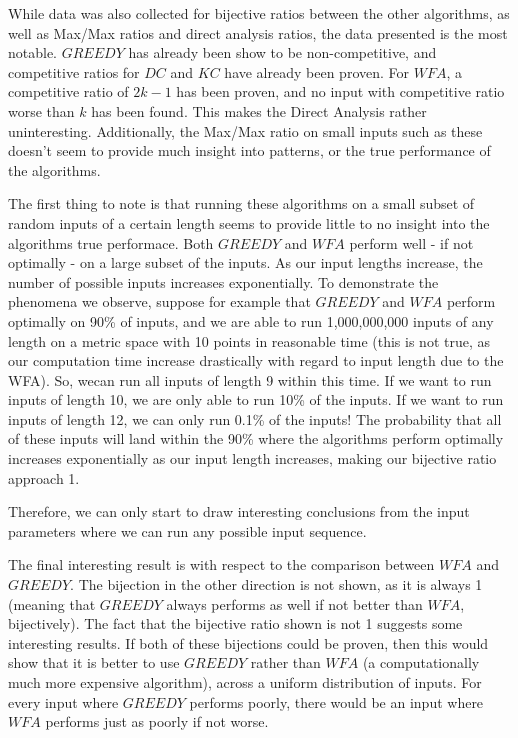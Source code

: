 While data was also collected for bijective ratios between the other algorithms, as well as Max/Max ratios and direct analysis ratios, the data presented is the most notable. $GREEDY$ has already been show to be non-competitive, and competitive ratios for $DC$ and $KC$ have already been proven. For $WFA$, a competitive ratio of $2k-1$ has been proven, and no input with competitive ratio worse than $k$ has been found. This makes the Direct Analysis rather uninteresting. Additionally, the Max/Max ratio on small inputs such as these doesn't seem to provide much insight into patterns, or the true performance of the algorithms.

The first thing to note is that running these algorithms on a small subset of random inputs of a certain length seems to provide little to no insight into the algorithms true performace. Both $GREEDY$ and $WFA$ perform well - if not optimally - on a large subset of the inputs. As our input lengths increase, the number of possible inputs increases exponentially. To demonstrate the phenomena we observe, suppose for example that $GREEDY$ and $WFA$ perform optimally on 90\% of inputs, and we are able to run 1,000,000,000 inputs of any length on a metric space with 10 points in reasonable time (this is not true, as our computation time increase drastically with regard to input length due to the WFA). So, wecan run all inputs of length 9 within this time. If we want to run inputs of length 10, we are only able to run 10\% of the inputs. If we want to run inputs of length 12, we can only run 0.1\% of the inputs! The probability that all of these inputs will land within the 90\% where the algorithms perform optimally increases exponentially as our input length increases, making our bijective ratio approach 1.

Therefore, we can only start to draw interesting conclusions from the input parameters where we can run any possible input sequence.

The final interesting result is with respect to the comparison between $WFA$ and $GREEDY$. The bijection in the other direction is not shown, as it is always 1 (meaning that $GREEDY$ always performs as well if not better than $WFA$, bijectively). The fact that the bijective ratio shown is not 1 suggests some interesting results. If both of these bijections could be proven, then this would show that it is better to use $GREEDY$ rather than $WFA$ (a computationally much more expensive algorithm), across a uniform distribution of inputs. For every input where $GREEDY$ performs poorly, there would be an input where $WFA$ performs just as poorly if not worse.  